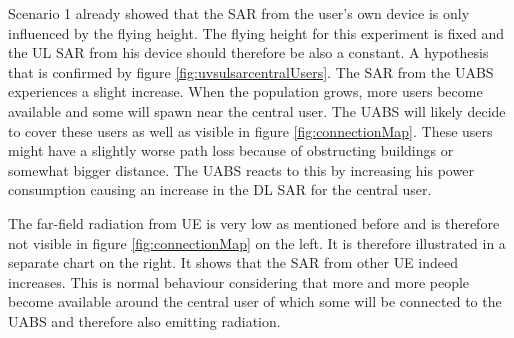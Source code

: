 Scenario 1 already showed that the \gls{SAR} from the user's own device is only influenced by the flying height. 
The flying height for this experiment is fixed and the \gls{UL} \gls{SAR} from his device should therefore be also a constant. 
A hypothesis that is confirmed by figure \ref{fig:uvsulsarcentralUsers}.
The \gls{SAR} from the \gls{UABS} experiences a slight increase. When the population grows, more users become available 
and some will spawn near the central user. The \gls{UABS} will likely decide to cover these users as well as visible in figure \ref{fig:connectionMap}.
These users might have a slightly 
worse path loss because of obstructing buildings or somewhat bigger distance. The \gls{UABS} reacts to this by increasing 
his power consumption causing an increase in the \gls{DL} \gls{SAR} for the central user.

The far-field radiation from \gls{UE} is very low as mentioned before and is therefore not visible in figure \ref{fig:connectionMap} 
on the left. It is therefore illustrated in a separate chart on the right. 
It shows that the \gls{SAR}  from other \gls{UE} indeed increases. This is normal 
behaviour considering that more and more people become available around the central user of which some will be connected to the \gls{UABS}
and therefore also emitting radiation.

